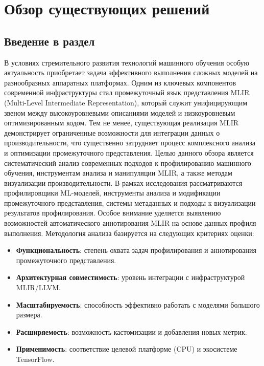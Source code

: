 \section{Обзор существующих решений}
\label{sec:Chapter2} 

\subsection{Введение в раздел}

В условиях стремительного развития технологий машинного обучения особую актуальность приобретает задача эффективного выполнения сложных моделей на разнообразных аппаратных платформах. Одним из ключевых компонентов современной инфраструктуры стал промежуточный язык представления MLIR (Multi-Level Intermediate Representation), который служит унифицирующим звеном между высокоуровневыми описаниями моделей и низкоуровневым оптимизированным кодом. Тем не менее, существующая реализация MLIR демонстрирует ограниченные возможности для интеграции данных о производительности, что существенно затрудняет процесс комплексного анализа и оптимизации промежуточного представления.
Целью данного обзора является систематический анализ современных подходов к профилированию машинного обучения, инструментам анализа и манипуляции MLIR, а также методам визуализации производительности. В рамках исследования рассматриваются профилировщики ML-моделей, инструменты анализа и модификации промежуточного представления, системы метаданных и подходы к визуализации результатов профилирования. Особое внимание уделяется выявлению возможностей автоматического аннотирования MLIR на основе данных профиля выполнения.
Методология анализа базируется на следующих критериях оценки:

\begin{itemize}
\item \textbf{Функциональность}: степень охвата задач профилирования и аннотирования промежуточного представления.
\item \textbf{Архитектурная совместимость}: уровень интеграции с инфраструктурой MLIR/LLVM.
\item \textbf{Масштабируемость}: способность эффективно работать с моделями большого размера.
\item \textbf{Расширяемость}: возможность кастомизации и добавления новых метрик.
\item \textbf{Применимость}: соответствие целевой платформе (CPU) и экосистеме TensorFlow.
\end{itemize}

